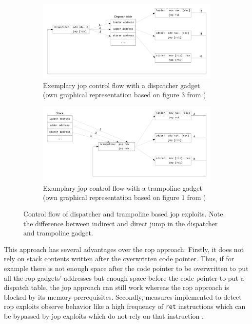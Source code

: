 \begin{figure}[htb]
	\centering
	\begin{subfigure}[t]{0.8\textwidth}
		\centering
		\includegraphics[width=\textwidth]{figures/jop-dispatcher}
		\caption{Exemplary \gls{jop} control flow with a dispatcher gadget (own graphical representation based on figure 3 from \cite{Bletsch2011})}
		\label{fig:jop-dispatcher}
		\vspace*{1em}
	\end{subfigure}
	\begin{subfigure}[t]{0.8\textwidth}
		\centering
		\includegraphics[width=\textwidth]{figures/jop-trampoline}
		\caption{Examplary \gls{jop} control flow with a trampoline gadget (own graphical representation based on figure 1 from \cite{Checkoway2010})}
		\label{fig:jop-trampoline}
	\end{subfigure}
	\caption{Control flow of dispatcher and trampoline based \gls{jop} exploits. Note the difference between indirect and direct jump in the dispatcher and trampoline gadget.}
	\label{fig:jump-oriented-programming}
\end{figure}

This approach has several advantages over the \gls{rop} approach:
Firstly, it does not rely on stack contents written after the overwritten code pointer.
Thus, if for example there is not enough space after the code pointer to be overwritten to put all the \gls{rop} gadgets' addresses but enough space before the code pointer to put a dispatch table, the \gls{jop} approach can still work whereas the \gls{rop} approach is blocked by its memory prerequisites.
Secondly, measures implemented to detect \gls{rop} exploits observe behavior like a high frequency of \texttt{ret} instructions which can be bypassed by \gls{jop} exploits which do not rely on that instruction \cite{Bletsch2011}.

